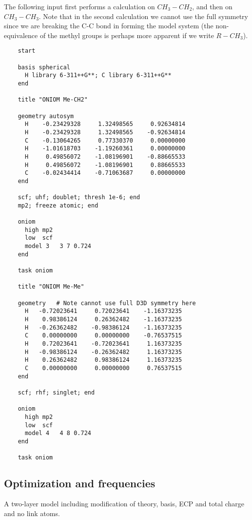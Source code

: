 The following input first performs a calculation on $CH_3-CH_2$, and then
on $CH_3-CH_3$.  Note that in the second calculation we cannot use the
full symmetry since we are breaking the C-C bond in forming the model
system (the non-equivalence of the methyl groups is perhaps more
apparent if we write $R-CH_3$).

\begin{verbatim}
    start

    basis spherical
      H library 6-311++G**; C library 6-311++G**
    end

    title "ONIOM Me-CH2"

    geometry autosym
      H    -0.23429328     1.32498565     0.92634814
      H    -0.23429328     1.32498565    -0.92634814
      C    -0.13064265     0.77330370     0.00000000
      H    -1.01618703    -1.19260361     0.00000000
      H     0.49856072    -1.08196901    -0.88665533
      H     0.49856072    -1.08196901     0.88665533
      C    -0.02434414    -0.71063687     0.00000000
    end

    scf; uhf; doublet; thresh 1e-6; end
    mp2; freeze atomic; end

    oniom
      high mp2
      low  scf
      model 3   3 7 0.724
    end

    task oniom

    title "ONIOM Me-Me"

    geometry   # Note cannot use full D3D symmetry here
      H   -0.72023641     0.72023641    -1.16373235
      H    0.98386124     0.26362482    -1.16373235
      H   -0.26362482    -0.98386124    -1.16373235
      C    0.00000000     0.00000000    -0.76537515
      H    0.72023641    -0.72023641     1.16373235
      H   -0.98386124    -0.26362482     1.16373235
      H    0.26362482     0.98386124     1.16373235
      C    0.00000000     0.00000000     0.76537515
    end

    scf; rhf; singlet; end

    oniom
      high mp2
      low  scf
      model 4   4 8 0.724
    end

    task oniom
\end{verbatim}

\subsection{Optimization and frequencies}
\label{sec:oniomeg2}
A two-layer model including modification of theory, basis, ECP and
total charge and no link atoms.

